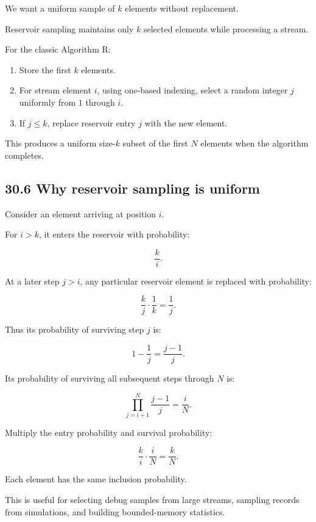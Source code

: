 We want a uniform sample of \(k\) elements without replacement.

Reservoir sampling maintains only \(k\) selected elements while processing a stream.

For the classic Algorithm R:

\begin{enumerate}
\def\labelenumi{\arabic{enumi}.}
\tightlist
\item
  Store the first \(k\) elements.
\item
  For stream element \(i\), using one-based indexing, select a random integer \(j\) uniformly from \(1\) through \(i\).
\item
  If \(j\le k\), replace reservoir entry \(j\) with the new element.
\end{enumerate}

This produces a uniform size-\(k\) subset of the first \(N\) elements when the algorithm completes.

\subsection{30.6 Why reservoir sampling is uniform}\label{02-foundations-ii-ch031-why-reservoir-sampling-is-uniform}

\hypertarget{02-foundations-ii-ch031-why-reservoir-sampling-is-uniform}{}

Consider an element arriving at position \(i\).

For \(i>k\), it enters the reservoir with probability:

\[ \frac{k}{i}. \]

At a later step \(j>i\), any particular reservoir element is replaced with probability:

\[ \frac{k}{j}\cdot\frac1k=\frac1j. \]

Thus its probability of surviving step \(j\) is:

\[ 1-\frac1j=\frac{j-1}{j}. \]

Its probability of surviving all subsequent steps through \(N\) is:

\[ \prod_{j=i+1}^{N}\frac{j-1}{j} = \frac iN. \]

Multiply the entry probability and survival probability:

\[ \frac ki\cdot\frac iN = \boxed{\frac kN}. \]

Each element has the same inclusion probability.

This is useful for selecting debug samples from large streams, sampling records from simulations, and building bounded-memory statistics.

